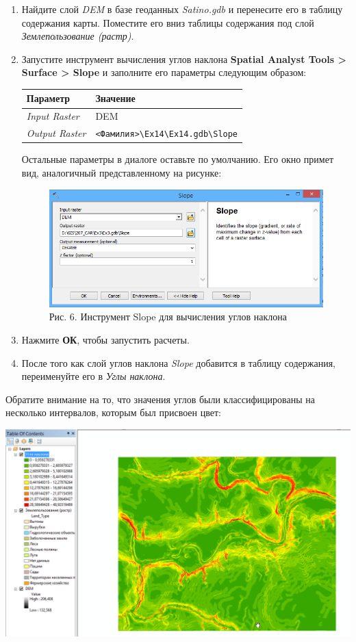 \documentclass[12pt,]{book}
\begin{document}
\begin{enumerate}
\def\labelenumi{\arabic{enumi}.}
\item
  Найдите слой \emph{DEM} в базе геоданных \emph{Satino.gdb} и перенесите его в таблицу содержания карты. Поместите его вниз таблицы содержания под слой \emph{Землепользование (растр)}.
\item
  Запустите инструмент вычисления углов наклона \textbf{Spatial Analyst Tools \textgreater{} Surface \textgreater{} Slope} и заполните его параметры следующим образом:

  \begin{longtable}[]{@{}ll@{}}
  \toprule
  Параметр & Значение\tabularnewline
  \midrule
  \endhead
  \emph{Input Raster} & DEM\tabularnewline
  \emph{Output Raster} & \texttt{\textless{}Фамилия\textgreater{}\textbackslash{}Ex14\textbackslash{}Ex14.gdb\textbackslash{}Slope}\tabularnewline
  \bottomrule
  \end{longtable}

  Остальные параметры в диалоге оставьте по умолчанию. Его окно примет вид, аналогичный представленному на рисунке:

  \begin{figure}
  \centering
  \includegraphics{images/Ex14/image7.png}
  \caption{Рис. 6. Инструмент Slope для вычисления углов наклона}
  \end{figure}
\item
  Нажмите \textbf{ОК}, чтобы запустить расчеты.
\item
  После того как слой углов наклона \emph{Slope} добавится в таблицу содержания, переименуйте его в \emph{Углы наклона}.
\end{enumerate}

Обратите внимание на то, что значения углов были классифицированы на несколько интервалов, которым был присвоен цвет:

\includegraphics{images/Ex14/image8.png}
\end{document}
